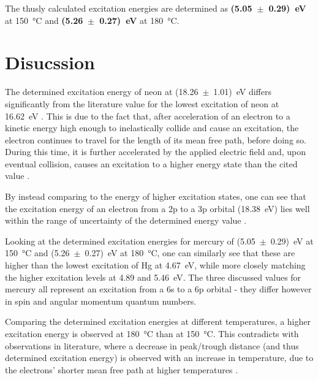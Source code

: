 \documentclass[titlepage]{article}
\begin{document}
The thusly calculated excitation energies are determined as \textbf{(5.05~\(\pm\)~0.29)~eV} at 150~°C and \textbf{(5.26~\(\pm\)~0.27)~eV} at 180~°C.

\newpage
\section{Disucssion}
The determined excitation energy of neon at (18.26~\(\pm\)~1.01)~eV differs significantly from the literature value for the lowest excitation of neon at 16.62~eV \autocite{Ne_Energies}. This is due to the fact that, after acceleration of an electron to a kinetic energy high enough to inelastically collide and cause an excitation, the electron continues to travel for the length of its mean free path, before doing so. During this time, it is further accelerated by the applied electric field and, upon eventual collision, causes an excitation to a higher energy state than the cited value \autocite{New_Features_of_FH_Exp}.

By instead comparing to the energy of higher excitation states, one can see that the excitation energy of an electron from a 2p to a 3p orbital (18.38~eV) lies well within the range of uncertainty of the determined energy value \autocite{Ne_Energies}.

Looking at the determined excitation energies for mercury of (5.05~\(\pm\)~0.29)~eV at 150~°C and (5.26~\(\pm\)~0.27)~eV at 180~°C, one can similarly see that these are higher than the lowest excitation of Hg at 4.67~eV, while more closely matching the higher excitation levels at 4.89 and 5.46~eV\autocite{Hg_Energies}. The three discussed values for mercury all represent an excitation from a 6s to a 6p orbital - they differ however in spin and angular momentum quantum numbers.

Comparing the determined excitation energies at different temperatures, a higher excitation energy is observed at 180~°C than at 150~°C. This contradicts with observations in literature, where a decrease in peak/trough distance (and thus determined excitation energy) is observed with an increase in temperature, due to the electrons' shorter mean free path at higher temperatures \autocite{New_Features_of_FH_Exp}.
\end{document}
